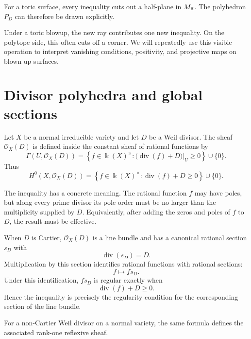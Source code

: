 \begin{surfacelaboratory}
For a toric surface, every inequality cuts out a half-plane in
\(M_{\mathbb{R}}\). The polyhedron \(P_D\) can therefore be drawn explicitly.

Under a toric blowup, the new ray contributes one new inequality. On
the polytope side, this often cuts off a corner. We will repeatedly
use this visible operation to interpret vanishing conditions,
positivity, and projective maps on blown-up surfaces.
\end{surfacelaboratory}

\section{Divisor polyhedra and global sections}
\label{sec:divisor-polyhedra-global-sections}

\begin{agcheatsheet}
Let \(X\) be a normal irreducible variety and let \(D\) be a Weil
divisor. The sheaf \(\mathcal O_X(D)\) is defined inside the constant
sheaf of rational functions by
\[
\Gamma(U,\mathcal O_X(D))
=
\left\{
 f\in\Bbbk(X)^\times:
 \bigl(\operatorname{div}(f)+D\bigr)|_U\geq0
\right\}
\cup\{0\}.
\]
Thus
\[
H^0(X,\mathcal O_X(D))
=
\left\{
 f\in\Bbbk(X)^\times:
 \operatorname{div}(f)+D\geq0
\right\}
\cup\{0\}.
\]

The inequality has a concrete meaning. The rational function \(f\)
may have poles, but along every prime divisor its pole order must be
no larger than the multiplicity supplied by \(D\). Equivalently,
after adding the zeros and poles of \(f\) to \(D\), the result must be
effective.

When \(D\) is Cartier, \(\mathcal O_X(D)\) is a line bundle and has a
canonical rational section \(s_D\) with
\[
\operatorname{div}(s_D)=D.
\]
Multiplication by this section identifies rational functions with
rational sections:
\[
f\longmapsto f s_D.
\]
Under this identification, \(f s_D\) is regular exactly when
\[
\operatorname{div}(f)+D\geq0.
\]
Hence the inequality is precisely the regularity condition for the
corresponding section of the line bundle.

For a non-Cartier Weil divisor on a normal variety, the same formula
defines the associated rank-one reflexive sheaf.
\end{agcheatsheet}

